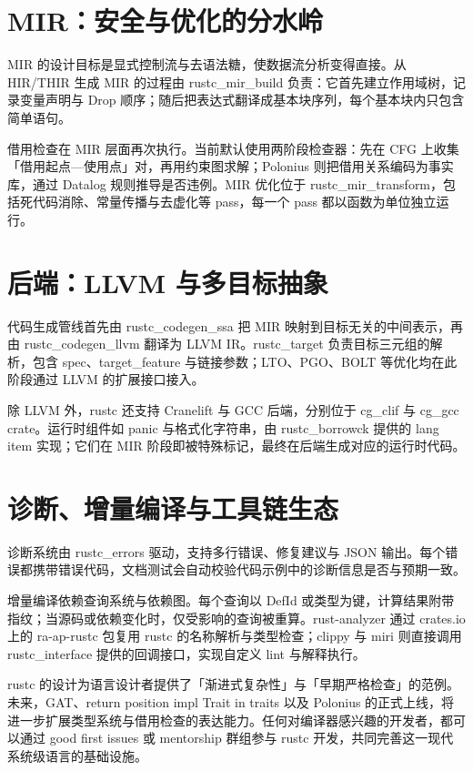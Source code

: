 \chapter{MIR：安全与优化的分水岭}
MIR 的设计目标是显式控制流与去语法糖，使数据流分析变得直接。从 HIR/THIR 生成 MIR 的过程由 rustc\_{}mir\_{}build 负责：它首先建立作用域树，记录变量声明与 Drop 顺序；随后把表达式翻译成基本块序列，每个基本块内只包含简单语句。\par
借用检查在 MIR 层面再次执行。当前默认使用两阶段检查器：先在 CFG 上收集「借用起点—使用点」对，再用约束图求解；Polonius 则把借用关系编码为事实库，通过 Datalog 规则推导是否违例。MIR 优化位于 rustc\_{}mir\_{}transform，包括死代码消除、常量传播与去虚化等 pass，每一个 pass 都以函数为单位独立运行。\par
\chapter{后端：LLVM 与多目标抽象}
代码生成管线首先由 rustc\_{}codegen\_{}ssa 把 MIR 映射到目标无关的中间表示，再由 rustc\_{}codegen\_{}llvm 翻译为 LLVM IR。rustc\_{}target 负责目标三元组的解析，包含 spec、target\_{}feature 与链接参数；LTO、PGO、BOLT 等优化均在此阶段通过 LLVM 的扩展接口接入。\par
除 LLVM 外，rustc 还支持 Cranelift 与 GCC 后端，分别位于 cg\_{}clif 与 cg\_{}gcc crate。运行时组件如 panic 与格式化字符串，由 rustc\_{}borrowck 提供的 lang item 实现；它们在 MIR 阶段即被特殊标记，最终在后端生成对应的运行时代码。\par
\chapter{诊断、增量编译与工具链生态}
诊断系统由 rustc\_{}errors 驱动，支持多行错误、修复建议与 JSON 输出。每个错误都携带错误代码，文档测试会自动校验代码示例中的诊断信息是否与预期一致。\par
增量编译依赖查询系统与依赖图。每个查询以 DefId 或类型为键，计算结果附带指纹；当源码或依赖变化时，仅受影响的查询被重算。rust-analyzer 通过 crates.io 上的 ra-ap-rustc 包复用 rustc 的名称解析与类型检查；clippy 与 miri 则直接调用 rustc\_{}interface 提供的回调接口，实现自定义 lint 与解释执行。\par
rustc 的设计为语言设计者提供了「渐进式复杂性」与「早期严格检查」的范例。未来，GAT、return position impl Trait in traits 以及 Polonius 的正式上线，将进一步扩展类型系统与借用检查的表达能力。任何对编译器感兴趣的开发者，都可以通过 good first issues 或 mentorship 群组参与 rustc 开发，共同完善这一现代系统级语言的基础设施。\par
